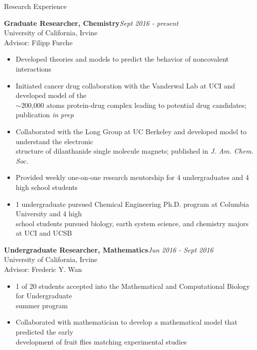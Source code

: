 \documentclass{resume} %
\begin{document}
\begin{rSection}{Research Experience}

\textbf{Graduate Researcher, Chemistry}\hfill {\em Sept 2016 - present}\\
University of California, Irvine\\
Advisor: Filipp Furche
\vspace{-0.5em}
\begin{itemize}    
\itemsep-0.65em
\item Developed theories and models to predict the behavior of noncovalent interactions
\item Initiated cancer drug collaboration with the Vanderwal Lab at UCI and developed model of
  the \\
  $\sim$200,000 atoms protein-drug complex leading to potential drug candidates; publication \textit{in prep}
\item Collaborated with the Long Group at UC Berkeley and developed model to understand the electronic \\
  structure of dilanthanide single molecule magnets; published in \textit{J. Am. Chem. Soc.}
\item Provided weekly one-on-one research mentorship for 4 undergraduates %
  and 4 high school students %
\item 1 undergraduate pursued Chemical Engineering Ph.D. program at Columbia University and
  4 high \\
  school students pursued biology, earth system science, and chemistry majors at UCI
  and UCSB
\end{itemize}

\textbf{Undergraduate Researcher, Mathematics}\hfill {\em Jun 2016 - Sept 2016}\\
University of California, Irvine \\
Advisor: Frederic Y. Wan
\vspace{-0.5em}
\begin{itemize}
\itemsep-0.65em
\item 1 of 20 students accepted into the Mathematical and Computational Biology for Undergraduate \\
  summer program
\item Collaborated with mathematician to develop a mathematical model that predicted the early \\
  development of fruit flies matching experimental studies
\end{itemize}
  

\end{rSection}
\end{document}
